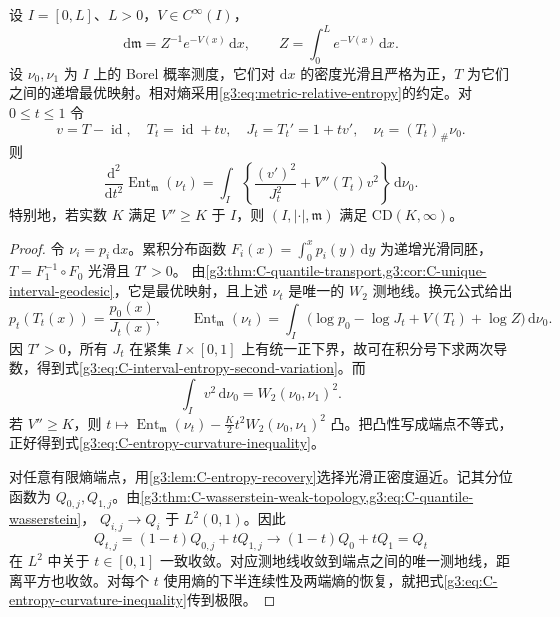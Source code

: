 \begin{proposition}\label{g3:prop:C-interval-entropy-variation}
	设 \(I=[0,L]\)、\(L>0\)，\(V\in C^\infty(I)\)，
	\[
		\mathrm d\mathfrak m=Z^{-1}e^{-V(x)}\,\mathrm dx,
		\qquad Z=\int_0^Le^{-V(x)}\,\mathrm dx.
	\]
	设 \(\nu_0,\nu_1\) 为 \(I\) 上的 Borel 概率测度，它们对 \(\mathrm dx\) 的密度光滑且严格为正，\(T\) 为它们之间的递增最优映射。相对熵采用\cref{g3:eq:metric-relative-entropy}的约定。对 \(0\le t\le1\) 令
	\[
		v=T-\operatorname{id},\quad
		T_t=\operatorname{id}+tv,\quad
		J_t=T_t'=1+tv',\quad \nu_t=(T_t)_\#\nu_0.
	\]
	则
	\begin{equation}\label{g3:eq:C-interval-entropy-second-variation}
		\frac{\mathrm d^2}{\mathrm dt^2}
		        \operatorname{Ent}_{\mathfrak m}(\nu_t)
		=\int_I\left\{\frac{(v')^2}{J_t^2}
		              +V''(T_t)v^2\right\}\,\mathrm d\nu_0.
	\end{equation}
	特别地，若实数 \(K\) 满足 \(V''\ge K\) 于 \(I\)，则
	\((I,|\cdot|,\mathfrak m)\) 满足 \(\mathrm{CD}(K,\infty)\)。
\end{proposition}
\begin{proof}
	令 \(\nu_i=p_i\,\mathrm dx\)。累积分布函数
	\(F_i(x)=\int_0^xp_i(y)\,\mathrm dy\) 为递增光滑同胚，
	\(T=F_1^{-1}\circ F_0\) 光滑且 \(T'>0\)。
	由\cref{g3:thm:C-quantile-transport,g3:cor:C-unique-interval-geodesic}，它是最优映射，且上述 \(\nu_t\) 是唯一的 \(W_2\) 测地线。换元公式给出
	\[
		p_t(T_t(x))=\frac{p_0(x)}{J_t(x)},\qquad
		\operatorname{Ent}_{\mathfrak m}(\nu_t)
		=\int_I\bigl(\log p_0-\log J_t+V(T_t)+\log Z\bigr)
		   \,\mathrm d\nu_0.
	\]
	因 \(T'>0\)，所有 \(J_t\) 在紧集 \(I\times[0,1]\) 上有统一正下界，故可在积分号下求两次导数，得到式\eqref{g3:eq:C-interval-entropy-second-variation}。而
	\[
		\int_Iv^2\,\mathrm d\nu_0=W_2(\nu_0,\nu_1)^2.
	\]
	若 \(V''\ge K\)，则
	\(t\mapsto\operatorname{Ent}_{\mathfrak m}(\nu_t)
	-\frac K2t^2W_2(\nu_0,\nu_1)^2\) 凸。把凸性写成端点不等式，正好得到式\eqref{g3:eq:C-entropy-curvature-inequality}。

	对任意有限熵端点，用\cref{g3:lem:C-entropy-recovery}选择光滑正密度逼近。记其分位函数为 \(Q_{0,j},Q_{1,j}\)。由\cref{g3:thm:C-wasserstein-weak-topology,g3:eq:C-quantile-wasserstein}，
	\(Q_{i,j}\to Q_i\) 于 \(L^2(0,1)\)。因此
	\[
		Q_{t,j}=(1-t)Q_{0,j}+tQ_{1,j}
		    \longrightarrow (1-t)Q_0+tQ_1=Q_t
	\]
	在 \(L^2\) 中关于 \(t\in[0,1]\) 一致收敛。对应测地线收敛到端点之间的唯一测地线，距离平方也收敛。对每个 \(t\) 使用熵的下半连续性及两端熵的恢复，就把式\eqref{g3:eq:C-entropy-curvature-inequality}传到极限。
\end{proof}

